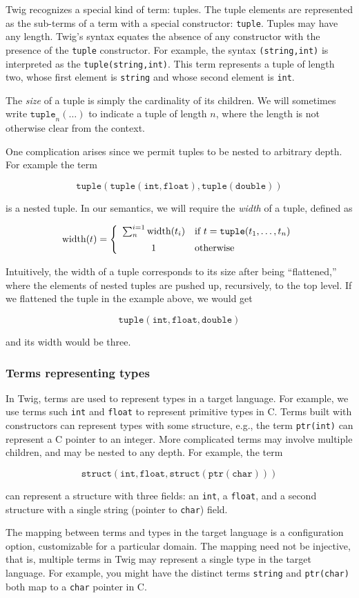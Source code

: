 Twig recognizes a special kind of term: tuples. The tuple elements
are represented as the sub-terms of a term with a special
constructor: \texttt{tuple}. Tuples may have any length. Twig's
syntax equates the absence of any constructor with the presence of
the \texttt{tuple} constructor. For example, the syntax
\texttt{(string,int)} is interpreted as the
\texttt{tuple(string,int)}. This term represents a tuple of length
two, whose first element is \texttt{string} and whose second
element is \texttt{int}.

The \emph{size} of a tuple is simply the cardinality of its
children. We will sometimes write $\mathtt{tuple}_n(\ldots)$ to
indicate a tuple of length $n$, where the length is not otherwise
clear from the context.

One complication arises since we permit tuples to be nested to
arbitrary depth. For example the term

\[
\mathtt{tuple(tuple(int,float),tuple(double))} 
\]

is a nested tuple. In our semantics, we will require the
\emph{width} of a tuple, defined as

\[
\mbox{width}(t) = \left\{
  \begin{array}{cl}
    \sum^{i=1}_{n} \mbox{width}(t_i) 
      & \mbox{if } t = \mathtt{tuple}(t_1,\ldots,t_n)\vspace{2mm}\\
    1 & \mbox{otherwise}
  \end{array}
\right.
\]

Intuitively, the width of a tuple corresponds to its size after
being ``flattened,'' where the elements of nested tuples are
pushed up, recursively, to the top level. If we flattened the
tuple in the example above, we would get

\[
\mathtt{tuple(int,float,double)}
\]

and its width would be three.


\subsubsection{Terms representing types}

In Twig, terms are used to represent types in a target language.
For example, we use terms such \texttt{int} and \texttt{float} to
represent primitive types in C. Terms built with constructors can
represent types with some structure, e.g., the term
\texttt{ptr(int)} can represent a C pointer to an integer. More
complicated terms may involve multiple children, and may be nested
to any depth. For example, the term

\[
\mathtt{struct(int,float,struct(ptr(char)))}
\]

can represent a structure with three fields: an \texttt{int}, a
\texttt{float}, and a second structure with a single string
(pointer to \texttt{char}) field.

The mapping between terms and types in the target language is a
configuration option, customizable for a particular domain. The
mapping need not be injective, that is, multiple terms in Twig may
represent a single type in the target language. For example, you
might have the distinct terms \texttt{string} and
\texttt{ptr(char)} both map to a \texttt{char} pointer in C.
